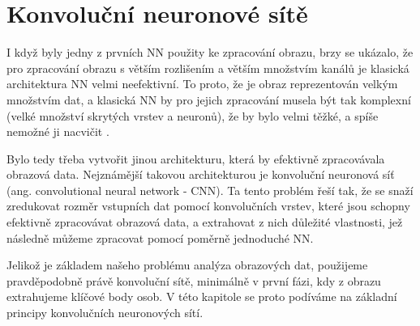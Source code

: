\chapter{Konvoluční neuronové sítě}
\label{chap:CNN}

I když byly jedny z prvních NN použity ke zpracování obrazu, brzy se ukázalo,
že pro zpracování obrazu s větším rozlišením a větším množstvím kanálů je
klasická architektura NN velmi neefektivní. To proto, že je obraz reprezentován
velkým množstvím dat, a klasická NN by pro jejich zpracování musela být tak
komplexní (velké množství skrytých vrstev a neuronů), že by bylo velmi těžké, a
spíše nemožné ji nacvičit \cite{cnn_introduction}.

Bylo tedy třeba vytvořit jinou architekturu, která by efektivně zpracovávala
obrazová data. Nejznámější takovou architekturou je konvoluční neuronová síť
(ang. convolutional neural network - CNN). Ta tento problém řeší tak, že se
snaží zredukovat rozměr vstupních dat pomocí konvolučních vrstev, které jsou
schopny efektivně zpracovávat obrazová data, a extrahovat z nich důležité
vlastnosti, jež následně můžeme zpracovat pomocí poměrně jednoduché NN.

Jelikož je základem našeho problému analýza obrazových dat, použijeme
pravděpodobně právě konvoluční sítě, minimálně v první fázi, kdy z obrazu
extrahujeme klíčové body osob. V této kapitole se proto podíváme na základní
principy konvolučních neuronových sítí.




